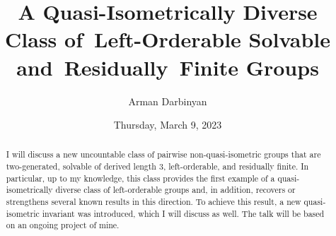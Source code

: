 \documentclass{UAmathtalk}
\author{Arman Darbinyan}
\title{A Quasi-Isometrically Diverse Class of~Left-Orderable Solvable and~Residually~Finite Groups}
\date{Thursday, March 9, 2023}
\begin{document}
\maketitle

\begin{abstract}
I will discuss a new uncountable class of pairwise non-quasi-isometric groups that are two-generated, solvable of derived length 3, left-orderable, and residually finite. In particular, up to my knowledge, this class provides the first example of a quasi-isometrically diverse class of left-orderable groups and, in addition, recovers or strengthens several known results in this direction. To achieve this result, a new quasi-isometric invariant was introduced, which I will discuss as well. The talk will be based on an ongoing project of mine.
\end{abstract}
\end{document}
